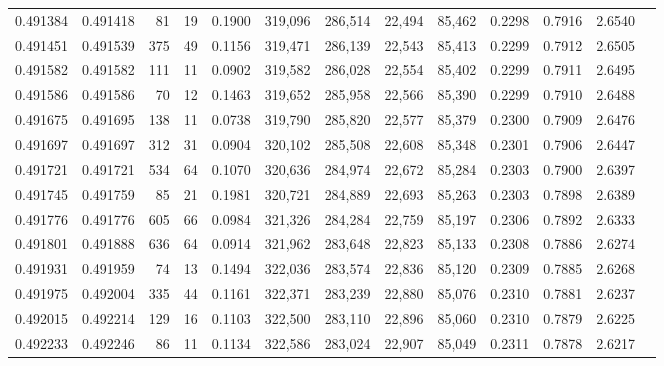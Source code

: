 \begin{tabular}{rrrrrrrrrrrrr}
0.491384 & 0.491418 &    81 &    19 &                                     0.1900 & 319,096 & 286,514 &  22,494 &  85,462 & 0.2298 & 0.7916 & 2.6540 \\
0.491451 & 0.491539 &   375 &    49 &                                     0.1156 & 319,471 & 286,139 &  22,543 &  85,413 & 0.2299 & 0.7912 & 2.6505 \\
0.491582 & 0.491582 &   111 &    11 &                                     0.0902 & 319,582 & 286,028 &  22,554 &  85,402 & 0.2299 & 0.7911 & 2.6495 \\
0.491586 & 0.491586 &    70 &    12 &                                     0.1463 & 319,652 & 285,958 &  22,566 &  85,390 & 0.2299 & 0.7910 & 2.6488 \\
0.491675 & 0.491695 &   138 &    11 &                                     0.0738 & 319,790 & 285,820 &  22,577 &  85,379 & 0.2300 & 0.7909 & 2.6476 \\
0.491697 & 0.491697 &   312 &    31 &                                     0.0904 & 320,102 & 285,508 &  22,608 &  85,348 & 0.2301 & 0.7906 & 2.6447 \\
0.491721 & 0.491721 &   534 &    64 &                                     0.1070 & 320,636 & 284,974 &  22,672 &  85,284 & 0.2303 & 0.7900 & 2.6397 \\
0.491745 & 0.491759 &    85 &    21 &                                     0.1981 & 320,721 & 284,889 &  22,693 &  85,263 & 0.2303 & 0.7898 & 2.6389 \\
0.491776 & 0.491776 &   605 &    66 &                                     0.0984 & 321,326 & 284,284 &  22,759 &  85,197 & 0.2306 & 0.7892 & 2.6333 \\
0.491801 & 0.491888 &   636 &    64 &                                     0.0914 & 321,962 & 283,648 &  22,823 &  85,133 & 0.2308 & 0.7886 & 2.6274 \\
0.491931 & 0.491959 &    74 &    13 &                                     0.1494 & 322,036 & 283,574 &  22,836 &  85,120 & 0.2309 & 0.7885 & 2.6268 \\
0.491975 & 0.492004 &   335 &    44 &                                     0.1161 & 322,371 & 283,239 &  22,880 &  85,076 & 0.2310 & 0.7881 & 2.6237 \\
0.492015 & 0.492214 &   129 &    16 &                                     0.1103 & 322,500 & 283,110 &  22,896 &  85,060 & 0.2310 & 0.7879 & 2.6225 \\
0.492233 & 0.492246 &    86 &    11 &                                     0.1134 & 322,586 & 283,024 &  22,907 &  85,049 & 0.2311 & 0.7878 & 2.6217 \\

\end{tabular}
